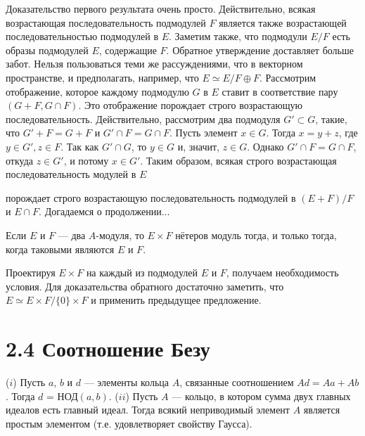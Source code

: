 \documentclass{../../template/mai_book}
\begin{document}
\begin{myproof}
Доказательство первого результата очень просто. Действительно, всякая возрастающая последовательность подмодулей $F$ является также возрастающей последовательностью подмодулей в $E$. Заметим также, что подмодули $E/F$ есть образы подмодулей $E$, содержащие $F$. \newline Обратное утверждение доставляет больше забот. Нельзя пользоваться теми же рассуждениями, что в векторном пространстве, и предполагать, например, что $E \simeq E/F \oplus F$. \newline Рассмотрим отображение, которое каждому подмодулю $G$ в $E$ ставит в соответствие пару $(G + F, G \cap F)$. Это отображение порождает строго возрастающую последовательность. Действительно, рассмотрим два подмодуля $G' \subset G$, такие, что $G' + F = G + F$ и $G' \cap F = G \cap F$. Пусть элемент $x \in G$. Тогда $x = y + z$, где $y \in G', z \in F$. Так как $G' \cap G$, то $y \in G$ и, значит, $z \in G$. Однако $G' \cap F = G \cap F$, откуда $z \in G'$, и потому $x \in G'$. Таким образом, всякая строго возрастающая последовательность модулей в $E$

\newpage
\noindent порождает строго возрастающую последовательность подмодулей в $(E + F)/F$ и $E \cap F$. Догадаемся о продолжении$\dots$
\end{myproof}

\begin{predl}
\textit{\indent} Если $E$ и $F$ — два $A$-модуля, то $E \times F$ нётеров модуль тогда, и только тогда, когда таковыми являются $E$ и $F$.
\end{predl}

\begin{myproof}
Проектируя $E \times F$ на каждый из подмодулей $E$ и $F$, получаем необходимость условия. Для доказательства обратного достаточно заметить, что $E \simeq E \times F / \{0\} \times F$ и применить предыдущее предложение.
\end{myproof}

\section{\large 2.4 Соотношение Безу}

\begin{predl}
\textit{\indent} ($i$) Пусть $a$, $b$ и $d$ — элементы кольца $A$, связанные соотношением \newline $Ad = Aa + Ab$. Тогда $d$ = НОД$(a, b)$. \newline \indent($ii$) Пусть $A$ — кольцо, в котором сумма двух главных идеалов есть главный идеал. Тогда всякий неприводимый элемент $A$ является простым элементом (т.е. удовлетворяет свойству Гаусса).
\end{predl}
\end{document}

